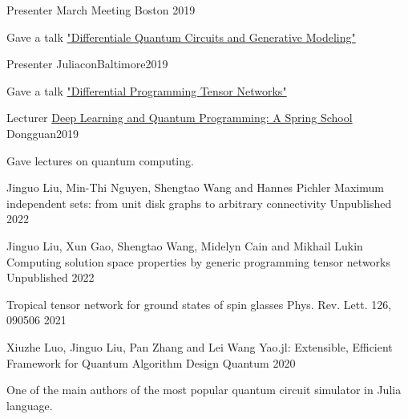 \documentclass[11pt, a4paper]{awesome-cv}
\begin{document}
%
\begin{cventries}
\cventry
    {Presenter} %
    {March Meeting} %
    {Boston} %
    {2019} %
    {
    \begin{cvitems}
        Gave a talk \href{https://meetings.aps.org/Meeting/MAR19/Session/E27.10}{"Differentiale Quantum Circuits and Generative Modeling"}
    \end{cvitems}
    }
\cventry
    {Presenter}
    {Juliacon}{Baltimore}{2019}
    {
    \begin{cvitems}
        Gave a talk \href{https://www.youtube.com/watch?v=f-CaQMTqjPk}{"Differential Programming Tensor Networks"}
    \end{cvitems}
    }
\cventry
    {Lecturer}
    {\href{https://github.com/QuantumBFS/SSSS}{Deep Learning and Quantum Programming: A Spring School}}
    {Dongguan}{2019}
    {
    \begin{cvitems}
        Gave lectures on quantum computing.
    \end{cvitems}
    }

\end{cventries}

%
%
\begin{cventries}
  \cventry
    {Jinguo Liu, Min-Thi Nguyen, Shengtao Wang and Hannes Pichler} %
    {Maximum independent sets: from unit disk graphs to arbitrary connectivity} %
    {Unpublished} %
    {2022} %
    {
      \begin{cvitems} %
        \item {}
      \end{cvitems}
    }
  \cventry
    {Jinguo Liu, Xun Gao, Shengtao Wang, Midelyn Cain and Mikhail Lukin} %
    {Computing solution space properties by generic programming tensor networks} %
    {Unpublished} %
    {2022} %
    {
      \begin{cvitems} %
        \item {}
      \end{cvitems}
    }
  {Tropical tensor network for ground states of spin glasses}
  {Phys. Rev. Lett. 126, 090506}
  {2021}
  {
      \begin{cvitems} %
        \item {}
      \end{cvitems}
  }
  \cventry
    {Xiuzhe Luo, Jinguo Liu, Pan Zhang and Lei Wang} %
    {Yao.jl: Extensible, Efficient Framework for Quantum Algorithm Design} %
    {Quantum} %
    {2020} %
    {
      \begin{cvitems} %
        \item {One of the main authors of the most popular quantum circuit simulator in Julia language.}
      \end{cvitems}
    }
\end{cventries}
\end{document}
